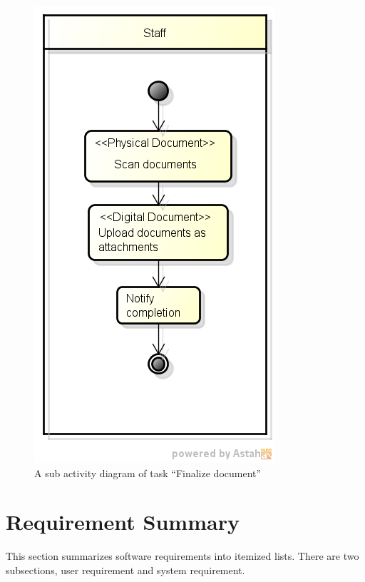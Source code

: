 \begin{figure}
	\centering
	\caption{A sub activity diagram of task \enquote{Finalize document}}
	\label{fig:diagram-finalize-document}
	\includegraphics[scale=0.5]{res/Methodology/finalize_document}
\end{figure}

\section{Requirement Summary}
This section summarizes software requirements into itemized lists.
There are two subsections, user requirement and system requirement.

